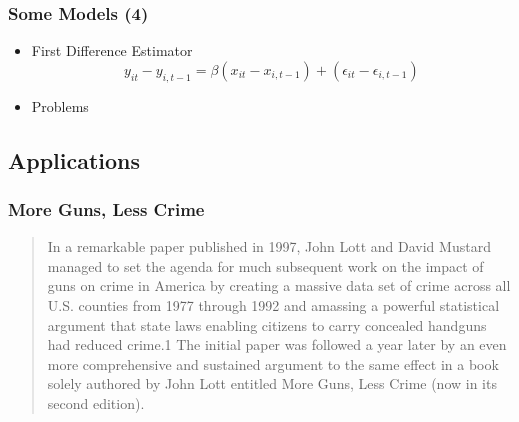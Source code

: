 \documentclass{beamer}
\newcommand{\1}{\mathbb{1}}
\begin{document}
\begin{frame}\frametitle{Some Models (4)}
\begin{itemize}
 \item First Difference Estimator
 \begin{equation}
 y_{it} - y_{i,t-1} =  \beta (x_{it} - x_{i,t-1}) + 
 (\epsilon_{it} - \epsilon_{i,t-1})
 \end{equation}
\item Problems
\end{itemize}

\end{frame}

\subsection{Applications}

\begin{frame}\frametitle{More Guns, Less Crime}
\begin{quote}
In a remarkable paper published in 1997, John Lott and David Mustard managed
to set the agenda for much subsequent work on the impact of guns on crime in America
by creating a massive data set of crime across all U.S. counties from 1977 through 1992
and amassing a powerful statistical argument that state laws enabling citizens to carry
concealed handguns had reduced crime.1
 The initial paper was followed a year later by
an even more comprehensive and sustained argument to the same effect in a book solely
authored by John Lott entitled More Guns, Less Crime (now in its second edition). 
\end{quote}
\end{frame}
\end{document}
